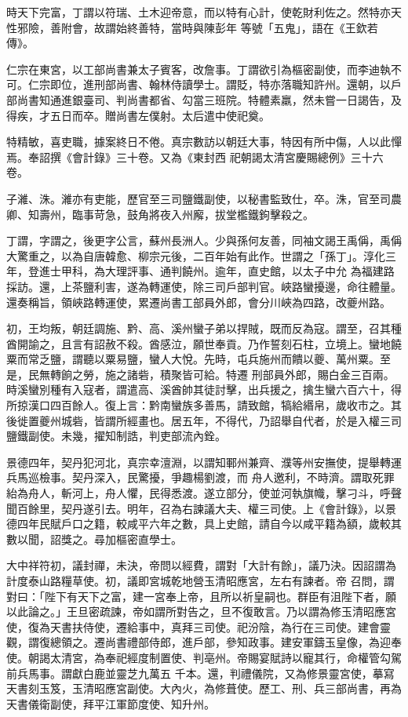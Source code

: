 \begin{pinyinscope}
 時天下完富，丁謂以符瑞、土木迎帝意，而以特有心計，使乾財利佐之。然特亦天性邪險，善附會，故謂始終善特，當時與陳彭年
 等號「五鬼」，語在《王欽若傳》。



 仁宗在東宮，以工部尚書兼太子賓客，改詹事。丁謂欲引為樞密副使，而李迪執不可。仁宗即位，進刑部尚書、翰林侍讀學士。謂貶，特亦落職知許州。還朝，以戶部尚書知通進銀臺司、判尚書都省、勾當三班院。特體素羸，然未嘗一日謁告，及得疾，才五日而卒。贈尚書左僕射。太后遣中使祀奠。



 特精敏，喜吏職，據案終日不倦。真宗數訪以朝廷大事，特因有所中傷，人以此憚焉。奉詔撰《會計錄》三十卷。又為《東封西
 祀朝謁太清宮慶賜總例》三十六卷。



 子濰、洙。濰亦有吏能，歷官至三司鹽鐵副使，以秘書監致仕，卒。洙，官至司農卿、知壽州，臨事苛急，鼓角將夜入州廨，拔堂檻鐵鉤擊殺之。



 丁謂，字謂之，後更字公言，蘇州長洲人。少與孫何友善，同袖文謁王禹偁，禹偁大驚重之，以為自唐韓愈、柳宗元後，二百年始有此作。世謂之「孫丁」。淳化三年，登進士甲科，為大理評事、通判饒州。逾年，直史館，以太子中允
 為福建路採訪。還，上茶鹽利害，遂為轉運使，除三司戶部判官。峽路蠻擾邊，命往體量。還奏稱旨，領峽路轉運使，累遷尚書工部員外郎，會分川峽為四路，改夔州路。



 初，王均叛，朝廷調施、黔、高、溪州蠻子弟以捍賊，既而反為寇。謂至，召其種酋開諭之，且言有詔赦不殺。酋感泣，願世奉貢。乃作誓刻石柱，立境上。蠻地饒粟而常乏鹽，謂聽以粟易鹽，蠻人大悅。先時，屯兵施州而饋以夔、萬州粟。至是，民無轉餉之勞，施之諸砦，積聚皆可給。特遷
 刑部員外郎，賜白金三百兩。時溪蠻別種有入寇者，謂遣高、溪酋帥其徒討擊，出兵援之，擒生蠻六百六十，得所掠漢口四百餘人。復上言：黔南蠻族多善馬，請致館，犒給緡帛，歲收市之。其後徙置夔州城砦，皆謂所經畫也。居五年，不得代，乃詔舉自代者，於是入權三司鹽鐵副使。未幾，擢知制誥，判吏部流內銓。



 景德四年，契丹犯河北，真宗幸澶淵，以謂知鄆州兼齊、濮等州安撫使，提舉轉運兵馬巡檢事。契丹深入，民驚擾，爭趣楊劉渡，而
 舟人邀利，不時濟。謂取死罪紿為舟人，斬河上，舟人懼，民得悉渡。遂立部分，使並河執旗幟，擊刁斗，呼聲聞百餘里，契丹遂引去。明年，召為右諫議大夫、權三司使。上《會計錄》，以景德四年民賦戶口之籍，較咸平六年之數，具上史館，請自今以咸平籍為額，歲較其數以聞，詔獎之。尋加樞密直學士。



 大中祥符初，議封禪，未決，帝問以經費，謂對「大計有餘」，議乃決。因詔謂為計度泰山路糧草使。初，議即宮城乾地營玉清昭應宮，左右有諫者。帝
 召問，謂對曰：「陛下有天下之富，建一宮奉上帝，且所以祈皇嗣也。群臣有沮陛下者，願以此論之。」王旦密疏諫，帝如謂所對告之，旦不復敢言。乃以謂為修玉清昭應宮使，復為天書扶侍使，遷給事中，真拜三司使。祀汾陰，為行在三司使。建會靈觀，謂復總領之。遷尚書禮部侍郎，進戶部，參知政事。建安軍鑄玉皇像，為迎奉使。朝謁太清宮，為奉祀經度制置使、判亳州。帝賜宴賦詩以寵其行，命權管勾駕前兵馬事。謂獻白鹿並靈芝九萬五
 千本。還，判禮儀院，又為修景靈宮使，摹寫天書刻玉笈，玉清昭應宮副使。大內火，為修葺使。歷工、刑、兵三部尚書，再為天書儀衛副使，拜平江軍節度使、知升州。




\end{pinyinscope}
